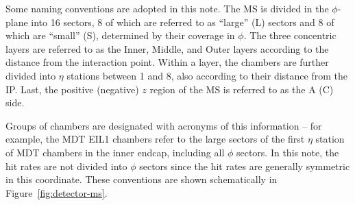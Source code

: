 Some naming conventions are adopted in this note. The MS is divided in the $\phi$-plane into 16 sectors, 8 of which are referred to as ``large'' (L) sectors and 8 of which are ``small'' (S), determined by their coverage in $\phi$. The three concentric layers are referred to as the Inner, Middle, and Outer layers according to the distance from the interaction point. Within a layer, the chambers are further divided into $\eta$ stations between 1 and 8, also according to their distance from the IP. Last, the positive (negative) $z$ region of the MS is referred to as the A (C) side.

Groups of chambers are designated with acronyms of this information -- for example, the MDT EIL1 chambers refer to the large sectors of the first $\eta$ station of MDT chambers in the inner endcap, including all $\phi$ sectors. In this note, the hit rates are not divided into $\phi$ sectors since the hit rates are generally symmetric in this coordinate. These conventions are shown schematically in Figure~\ref{fig:detector-ms}.


